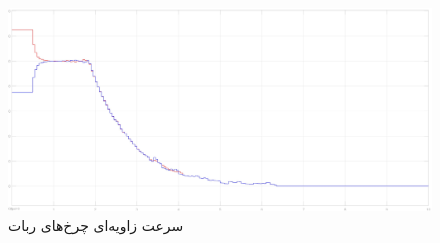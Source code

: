  \begin{figure}[!h] 
 	\centering
 	\includegraphics[scale=0.12]{Images/1-robot motors.jpg}
 	\caption{سرعت زاویه‌ای چرخ‌های ربات} \label{Fig 1-robot-motors}
 \end{figure}
 
 
 
 
 
 
 
 
 
 
 
 